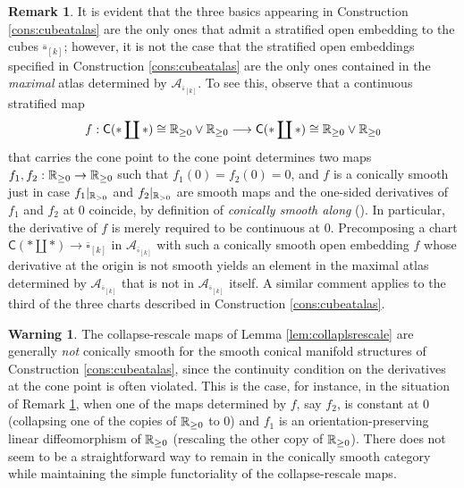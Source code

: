 \documentclass[10pt, reqno, twoside
, final
]{amsart}
\numberwithin{equation}{subsection}%
\theoremstyle{definition}
\theoremstyle{definition}
\theoremstyle{definition}
\theoremstyle{definition}
\theoremstyle{definition}
\theoremstyle{definition}
\theoremstyle{definition}
\theoremstyle{definition}
\newtheorem{warn}[defn]{Warning}
\theoremstyle{definition}
\theoremstyle{plain}
\theoremstyle{definition}
\theoremstyle{plain}
\theoremstyle{definition}
\theoremstyle{plain}
\theoremstyle{definition}
\newtheorem{rmk}[defn]{Remark}
\theoremstyle{definition}
\theoremstyle{plain}
\theoremstyle{plain}
\theoremstyle{definition}
\theoremstyle{plain}
\theoremstyle{plain}
\theoremstyle{plain}
\begin{document}
\begin{rmk}\label{Rem:not_con_smooth}
It is evident that the three basics appearing in Construction \ref{cons:cubeatalas} are the only ones that admit a stratified open embedding to the cubes $\overline{\square}_{[k]}$; however, it is not the case that the stratified open embeddings specified in Construction \ref{cons:cubeatalas} are the only ones contained in the \emph{maximal} atlas determined by $\mathcal{A}_{\overline{\square}_{[k]}}$. To see this, observe that a continuous stratified map 
\[f:\mathsf{C}(*\coprod *)\cong \mathbb{R}_{\geq0}\vee \mathbb{R}_{\geq 0} \longrightarrow \mathsf{C}(*\coprod *)\cong \mathbb{R}_{\geq0}\vee \mathbb{R}_{\geq 0} \]
that carries the cone point to the cone point determines two maps $f_1,f_2:\mathbb{R}_{\geq 0}\rightarrow\mathbb{R}_{\geq 0}$ such that $f_1(0)=f_2(0)=0$, and $f$ is a conically smooth just in case $f_1|_{\mathbb{R}_{>0}}$ and $f_2|_{\mathbb{R}_{>0}}$ are smooth maps and the one-sided derivatives of $f_1$ and $f_2$ at $0$ coincide, by definition of \emph{conically smooth along} (\cite[Definition 3.1.4]{AFT-local-structures}). In particular, the derivative of $f$ is merely required to be continuous at $0$. Precomposing a chart $\mathsf{C}(*\coprod *)\rightarrow \overline{\square}_{[k]}$ in $\mathcal{A}_{\overline{\square}_{[k]}}$ with such a conically smooth open embedding $f$ whose derivative at the origin is not smooth yields an element in the maximal atlas determined by $\mathcal{A}_{\overline{\square}_{[k]}}$ that is not in $\mathcal{A}_{\overline{\square}_{[k]}}$ itself. A similar comment applies to the third of the three charts described in Construction \ref{cons:cubeatalas}. 
\end{rmk}
\begin{warn}\label{warn:consmf}
The collapse-rescale maps of Lemma \ref{lem:collaplsrescale} are generally \emph{not} conically smooth for the smooth conical manifold structures of Construction \ref{cons:cubeatalas}, since the continuity condition on the derivatives at the cone point is often violated. This is the case, for instance, in the situation of  Remark \ref{Rem:not_con_smooth}, when one of the maps determined by $f$, say $f_2$, is constant at $0$ (collapsing one of the copies of $\mathbb{R}_{\geq 0}$ to $0$) and $f_1$ is an orientation-preserving linear diffeomorphism of $\mathbb{R}_{\geq 0}$ (rescaling the other copy of $\mathbb{R}_{\geq 0}$). There does not seem to be a straightforward way to remain in the conically smooth category while maintaining the simple functoriality of the collapse-rescale maps. 
\end{warn}
\end{document}
